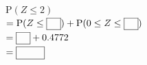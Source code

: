\noindent\begin{minipage}[t]{0.58\linewidth}\vspace{0pt}\raggedright $\mathrm{P}(Z\le 2)$\\ $=\mathrm{P}(Z\le\blank)+\mathrm{P}(0\le Z\le\blank)$\\ $=\blank+0.4772$\\ $=\blank[3em]$\end{minipage}\hfill\begin{minipage}[t]{0.4\linewidth}\vspace{0pt}\centering \resizebox{\ifdim\width>\linewidth\linewidth\else\width\fi}{!}{}\end{minipage}\par
